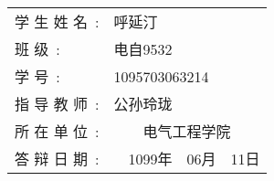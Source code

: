 \begin{table}[htbp]
    \centering
    \linespread{1.8}
    \heiti
    \renewcommand\arraystretch{1.028}
\begin{tabular}{p{4.58cm}<{\raggedleft} p{6.88cm}<{\centering}}
学\hspace{0.54em} 生\hspace{0.54em} 姓\hspace{0.54em} 名\ :&呼延汀  \\%
班 \hspace{3.9em} 级\ :                                   &电自9532 \\%
学 \hspace{3.9em} 号\ :                                   &1095703063214  \\%
指\hspace{0.54em} 导\hspace{0.54em} 教\hspace{0.54em} 师\ :&公孙玲珑  \\%
所\hspace{0.54em} 在\hspace{0.54em} 单\hspace{0.54em} 位\ :&\  \  \  \  电气工程学院  \\%
答\hspace{0.54em} 辩\hspace{0.54em} 日\hspace{0.54em} 期\ :&\  \  1099年\  \  06月\  \  11日    \\%

\end{tabular}
\end{table}
\cleardoublepage